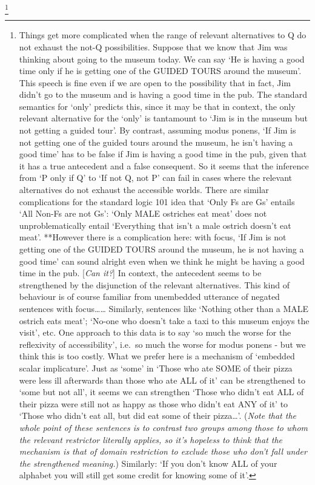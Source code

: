 \documentclass[leqno, 11pt, a5paper, openany]{article}
\begin{document}
\footnote{Things get more complicated when the range of relevant alternatives to Q do not exhaust the not-Q possibilities. Suppose that we know that Jim was thinking about going to the museum today. We can say ‘He is having a good time only if he is getting one of the GUIDED TOURS around the museum’. This speech is fine even if we are open to the possibility that in fact, Jim didn't go to the museum and is having a good time in the pub. The standard semantics for ‘only’ predicts this, since it may be that in context, the only relevant alternative for the ‘only’ is tantamount to ‘Jim is in the museum but not getting a guided tour’. By contrast, assuming modus ponens, `If Jim is not getting one of the guided tours around the museum, he isn't having a good time' has to be false if Jim is having a good time in the pub, given that it has a true antecedent and a false consequent. So it seems that the inference from ‘P only if Q’ to ‘If not Q, not P’ can fail in cases where the relevant alternatives do not exhaust the accessible worlds. There are similar complications for the standard logic 101 idea that ‘Only Fs are Gs’ entails ‘All Non-Fs are not Gs’: ‘Only MALE ostriches eat meat’ does not unproblematically entail `Everything that isn't a male ostrich doesn't eat meat'. **However there is a complication here: with focus, ‘If Jim is not getting one of the GUIDED TOURS around the museum, he is not having a good time’ can sound alright even when we think he might be having a good time in the pub. {[}\emph{Can it?}{]} In context, the antecedent seems to be strengthened by the disjunction of the relevant alternatives. This kind of behaviour is of course familiar from unembedded utterance of negated sentences with focus\ldots{}\ldots{} Similarly, sentences like ‘Nothing other than a MALE ostrich eats meat’; `No-one who doesn't take a taxi to this museum enjoys the visit', etc. One approach to this data is to say ‘so much the worse for the reflexivity of accessibility’, i.e.~so much the worse for modus ponens - but we think this is too costly. What we prefer here is a mechanism of ‘embedded scalar implicature’. Just as ‘some’ in ‘Those who ate SOME of their pizza were less ill afterwards than those who ate ALL of it’ can be strengthened to ‘some but not all’, it seems we can strengthen `Those who didn't eat ALL of their pizza were still not as happy as those who didn't eat ANY of it' to `Those who didn't eat all, but did eat some of their pizza\ldots{}'. (\emph{Note that the whole point of these sentences is to contrast two groups among those to whom the relevant restrictor literally applies, so it's hopeless to think that the mechanism is that of domain restriction to exclude those who don't fall under the strengthened meaning.}) Similarly: `If you don't know ALL of your alphabet you will still get some credit for knowing some of it'.}
\end{document}
